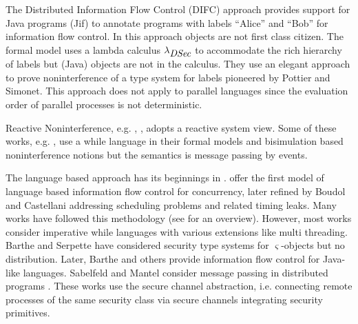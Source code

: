 \documentclass[10pt, conference, compsocconf]{IEEEtran}
\newcommand{\symb}[1]{\makebox{\it #1}}
\begin{document}
{The Distributed Information Flow Control (DIFC) approach \cite{ml:97} provides
support for Java programs (Jif) to annotate programs with labels ``Alice'' 
and ``Bob'' for information flow control. In this approach objects are not first class
citizen. The formal model \cite{zm:07} uses a lambda calculus $\lambda_{\symb{DSec}}$ to 
accommodate the rich hierarchy of labels but (Java) objects are not in the calculus.
They use an elegant approach to prove noninterference of a type system for labels
pioneered by \cite{ps:03} Pottier and Simonet. This approach does not apply to parallel 
languages since the evaluation order of parallel processes is not deterministic.

Reactive Noninterference, e.g. \cite{DBLP:journals/jlp/MatosBC07}, \cite{bpswz:09},
adopts a reactive system view. Some of these works, 
e.g. \cite{occ:06}, use a while language in their formal models and bisimulation
based noninterference notions but the semantics is message passing by events.

The language based approach has its beginnings in \cite{vsi:96,vs:97}.
\cite{sv:98} offer the first model of language based 
information flow control  for concurrency, later refined by Boudol and Castellani
addressing scheduling problems and related timing leaks.
Many works have followed this methodology (see \cite{sm:03} for an overview).
However, most works consider imperative while languages with various extensions 
like multi threading. 
Barthe and Serpette  \cite{bs:00} have considered security type systems for $\varsigma$-objects
but no distribution. Later, Barthe and others 
\cite{bpr:07,kam:08} provide information flow control for Java-like languages. 
Sabelfeld and Mantel consider message passing in distributed programs \cite{sm:02,ms:03}.
These works use the secure channel abstraction, i.e. connecting remote processes of
the same security class via secure channels integrating security primitives.

}
\end{document}
